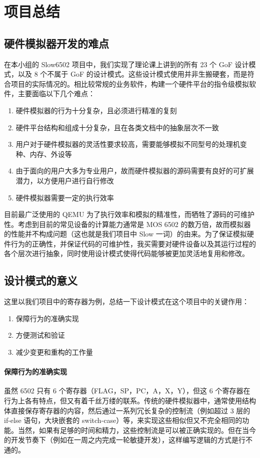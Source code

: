 \section{项目总结}

\subsection{硬件模拟器开发的难点}

在本小组的 Slow6502 项目中，我们实现了理论课上讲到的所有 23 个 GoF 设计模式，以及 8 个不属于 GoF 的设计模式。这些设计模式使用并非生搬硬套，而是符合项目的实际情况的。相比较常规的业务软件，构建一个硬件平台的指令级模拟软件，主要面临以下几个难点：
\begin{enumerate}
    \item 硬件模拟器的行为十分复杂，且必须进行精准的复刻
    \item 硬件平台结构和组成十分复杂，且在各类文档中的抽象层次不一致
    \item 用户对于硬件模拟器的灵活性要求较高，需要能够模拟不同型号的处理机变种、内存、外设等
    \item 由于面向的用户大多为专业用户，故而硬件模拟器的源码需要有良好的可扩展潜力，以方便用户进行自行修改
    \item 硬件模拟器需要一定的执行效率
\end{enumerate}

目前最广泛使用的 QEMU 为了执行效率和模拟的精准性，而牺牲了源码的可维护性。考虑到目前的常见设备的计算能力通常是 MOS 6502 的数万倍，故而模拟器的性能并不构成问题（这也就是我们项目中 Slow 一词）的由来。为了保证模拟硬件行为的正确性，并保证代码的可维护性，我买需要对硬件设备以及其运行过程的各个层次进行抽象，同时使用设计模式使得代码能够被更加灵活地复用和修改。

\subsection{设计模式的意义}
这里以我们项目中的寄存器为例，总结一下设计模式在这个项目中的关键作用：
\begin{enumerate}
    \item 保障行为的准确实现
    \item 方便测试和验证
    \item 减少变更和重构的工作量
\end{enumerate}

\paragraph{保障行为的准确实现} 虽然 6502 只有 6 个寄存器（FLAG，SP，PC，A，X，Y），但这 6 个寄存器在行为上各有特点，但又有着千丝万缕的联系。传统的硬件模拟器中，通常使用结构体直接保存寄存器的内容，然后通过一系列冗长复杂的控制流（例如超过 3 层的 if-else 语句，大块嵌套的 switch-case）等，来实现这些相似但又不完全相同的功能。当然，如果有足够的时间和精力，这些控制流是可以被正确实现的。但在当今的开发节奏下（例如在一周之内完成一轮敏捷开发），这样编写逻辑的方式是行不通的。

